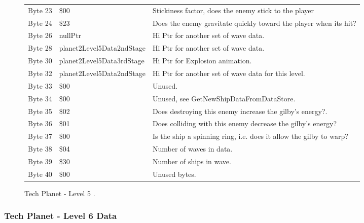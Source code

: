 \begin{figure}[H]
{\begin{adjustbox}{width=12cm}
\begin{tabular}{lll}
 Byte 23 & \$00                       & Stickiness factor, does the enemy stick to the player              \\
 Byte 24 & \$23                       & Does the enemy gravitate quickly toward the player when its hit?   \\
 Byte 26 & nullPtr                   & Hi Ptr for another set of wave data.                               \\
 Byte 28 & planet2Level5Data2ndStage & Hi Ptr for another set of wave data.                               \\
 Byte 30 & planet2Level5Data3rdStage & Hi Ptr for Explosion animation.                                    \\
 Byte 32 & planet2Level5Data2ndStage & Hi Ptr for another set of wave data for this level.                \\
 Byte 33 & \$00                       & Unused.                                                            \\
 Byte 34 & \$00                       & Unused, see GetNewShipDataFromDataStore.                           \\
 Byte 35 & \$02                       & Does destroying this enemy increase the gilby's energy?.           \\
 Byte 36 & \$01                       & Does colliding with this enemy decrease the gilby's energy?        \\
 Byte 37 & \$00                       & Is the ship a spinning ring, i.e. does it allow the gilby to warp? \\
 Byte 38 & \$04                       & Number of waves in data.                                           \\
 Byte 39 & \$30                       & Number of ships in wave.                                           \\
 Byte 40 & \$00                       & Unused bytes.                                                      \\
\bottomrule
\end{tabular}

  \end{adjustbox}

  }\caption*{Tech Planet - Level 5
.}
\end{figure}

\clearpage
\subsubsection{Tech Planet - Level 6 Data}

